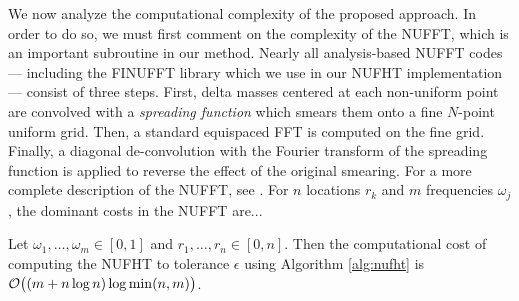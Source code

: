 We now analyze the computational complexity of the proposed approach. In order
to do so, we must first comment on the complexity of the NUFFT, which is an
important subroutine in our method. Nearly all analysis-based NUFFT codes ---
including the FINUFFT library \cite{barnett2019parallel} which we use in our
NUFHT implementation --- consist of three steps. First, delta masses centered at
each non-uniform point are convolved with a \textit{spreading function} which
smears them onto a fine $N$-point uniform grid. Then, a standard equispaced FFT
is computed on the fine grid. Finally, a diagonal de-convolution with the
Fourier transform of the spreading function is applied to reverse the effect of
the original smearing. For a more complete description of the NUFFT, see
\todocite. For $n$ locations $r_k$ and $m$ frequencies $\omega_j$, the dominant
costs in the NUFFT are... 

\begin{theorem}
    Let $\omega_1,\dots,\omega_m \in [0,1]$ and $r_1,\dots,r_n \in [0,n]$. Then
    the computational cost of computing the NUFHT to tolerance $\epsilon$ using
    Algorithm \ref{alg:nufht} is $\mathcal{O}\big((m + n\log n) \log \min(n,m) \big)$.
\end{theorem}

